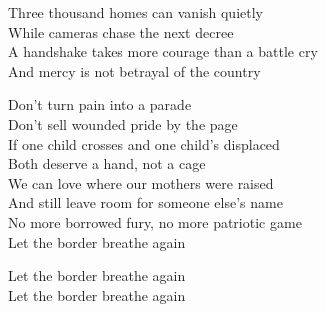 \begin{lyrics}
Three thousand homes can vanish quietly\\
While cameras chase the next decree\\
A handshake takes more courage than a battle cry\\
And mercy is not betrayal of the country

Don't turn pain into a parade\\
Don't sell wounded pride by the page\\
If one child crosses and one child's displaced\\
Both deserve a hand, not a cage\\
We can love where our mothers were raised\\
And still leave room for someone else's name\\
No more borrowed fury, no more patriotic game\\
Let the border breathe again

Let the border breathe again\\
Let the border breathe again
\end{lyrics}

